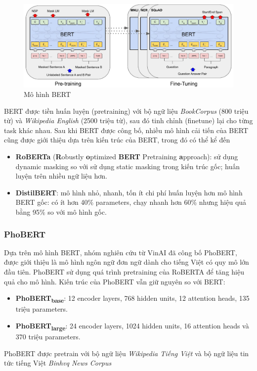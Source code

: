 \documentclass[12pt]{article}
\begin{document}
\begin{figure}
\centering
\includegraphics[scale=.65]{img/BERT.jpg}
\caption{Mô hình BERT\cite{devlin-etal-2019-bert}}
\label{fig:my_label}
\end{figure}
BERT được tiền huấn luyện (pretraining) với bộ ngữ liệu \textit{BookCorpus} (800 triệu từ) và \textit{Wikipedia English} (2500 triệu từ), sau đó tinh chỉnh (finetune) lại cho từng task khác nhau. Sau khi BERT được công bố, nhiều mô hình cải tiến của BERT cũng được giới thiệu dựa trên kiến trúc của BERT, trong đó có thể kể đến
\begin{itemize}
\item \textbf{RoBERTa} (\textbf{R}obustly \textbf{o}ptimized \textbf{BERT} Pretraining \textbf{a}pproach)\cite{DBLP:journals/corr/abs-1907-11692}: sử dụng dynamic masking so với sử dụng static masking trong kiến trúc gốc; huấn luyện trên nhiều ngữ liệu hơn.
\item \textbf{DistilBERT}\cite{DBLP:journals/corr/abs-1910-01108}: mô hình nhỏ, nhanh, tốn ít chi phí huấn luyện hơn mô hình BERT gốc: có ít hơn 40\% parameters, chạy nhanh hơn 60\% nhưng hiệu quả bằng 95\% so với mô hình gốc.
\end{itemize}

\subsubsection{PhoBERT}
Dựa trên mô hình BERT, nhóm nghiên cứu từ VinAI đã công bố PhoBERT\cite{phobert}, được giới thiệu là mô hình ngôn ngữ đơn ngữ dành cho tiếng Việt có quy mô lớn đầu tiên. PhoBERT sử dụng quá trình pretraining của RoBERTA để tăng hiệu quả cho mô hình. Kiến trúc của PhoBERT vẫn giữ nguyên so với BERT:
\begin{itemize}
\item \textbf{PhoBERT\textsubscript{base}}: 12 encoder layers, 768 hidden units, 12 attention heads, 135 triệu parameters.
\item \textbf{PhoBERT\textsubscript{large}}: 24 encoder layers, 1024 hidden units, 16 attention heads và 370 triệu parameters.
\end{itemize}
PhoBERT được pretrain với bộ ngữ liệu \textit{Wikipedia Tiếng Việt} và bộ ngữ liệu tin tức tiếng Việt \textit{Binhvq News Corpus}
\end{document}
